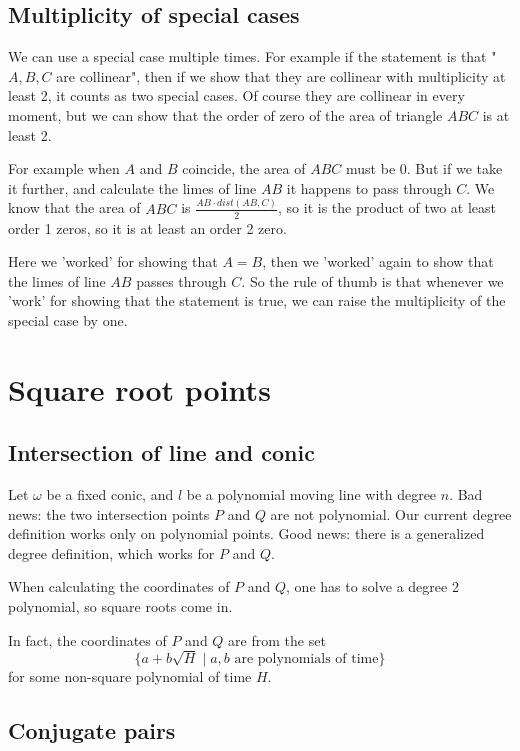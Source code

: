 \documentclass[a4paper]{article}
\begin{document}
\subsection{Multiplicity of special cases}

We can use a special case multiple times. For example if the statement is that "$A, B, C$ are collinear", then if we show that they are collinear with multiplicity at least 2, it counts as two special cases. Of course they are collinear in every moment, but we can show that the order of zero of the area of triangle $ABC$ is at least 2.

For example when $A$ and $B$ coincide, the area  of $ABC$ must be 0. But if we take it further, and calculate the limes of line $AB$ it happens to pass through $C$. We know that the area of $ABC$ is $\frac{AB\cdot dist(AB, C)}{2}$, so it is the product of two at least order 1 zeros, so it is at least an order 2 zero.

Here we 'worked' for showing that $A=B$, then we 'worked' again to show that the limes of line $AB$ passes through $C$. So the rule of thumb is that whenever we 'work' for showing that the statement is true, we can raise the multiplicity of the special case by one.

\section{Square root points}\label{sqrt}

\subsection{Intersection of line and conic}

Let $\omega$ be a fixed conic, and $l$ be a polynomial moving line with degree $n$. Bad news: the two intersection points $P$ and $Q$ are not polynomial. Our current degree definition works only on polynomial points. Good news: there is a generalized degree definition, which works for $P$ and $Q$.

When calculating the coordinates of $P$ and $Q$, one has to solve a degree 2 polynomial, so square roots come in.

In fact, the coordinates of $P$ and $Q$ are from the set $$\{a+b\sqrt{H}\mid a,b \text{ are polynomials of time}\}$$
for some non-square polynomial of time $H$.

\subsection{Conjugate pairs}
\end{document}
